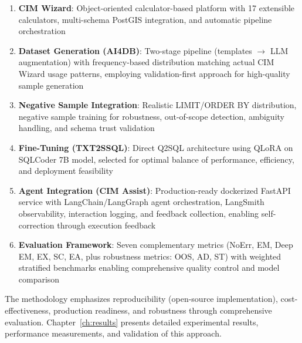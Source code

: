 \begin{enumerate}[leftmargin=1.2em]
  \item \textbf{CIM Wizard}: Object-oriented calculator-based platform with 17 extensible calculators, multi-schema PostGIS integration, and automatic pipeline orchestration
  
  \item \textbf{Dataset Generation (AI4DB)}: Two-stage pipeline (templates $\rightarrow$ LLM augmentation) with frequency-based distribution matching actual CIM Wizard usage patterns, employing validation-first approach for high-quality sample generation
  
  \item \textbf{Negative Sample Integration}: Realistic LIMIT/ORDER BY distribution, negative sample training for robustness, out-of-scope detection, ambiguity handling, and schema trust validation
  
  \item \textbf{Fine-Tuning (TXT2SSQL)}: Direct Q2SQL architecture using QLoRA on SQLCoder 7B model, selected for optimal balance of performance, efficiency, and deployment feasibility
  
  \item \textbf{Agent Integration (CIM Assist)}: Production-ready dockerized FastAPI service with LangChain/LangGraph agent orchestration, LangSmith observability, interaction logging, and feedback collection, enabling self-correction through execution feedback
  
  \item \textbf{Evaluation Framework}: Seven complementary metrics (NoErr, EM, Deep EM, EX, SC, EA, plus robustness metrics: OOS, AD, ST) with weighted stratified benchmarks enabling comprehensive quality control and model comparison
\end{enumerate}

The methodology emphasizes reproducibility (open-source implementation), cost-effectiveness, production readiness, and robustness through comprehensive evaluation. Chapter~\ref{ch:results} presents detailed experimental results, performance measurements, and validation of this approach.

